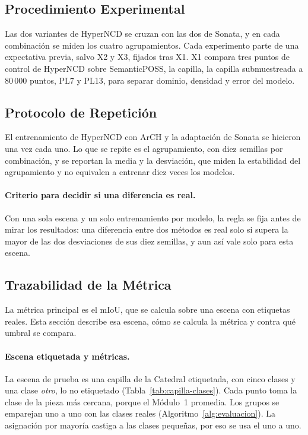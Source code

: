 \subsection{Procedimiento Experimental}
\label{sec:procedimiento}

Las dos variantes de HyperNCD se cruzan con las dos de Sonata, y en cada combinación
se miden los cuatro agrupamientos. Cada experimento parte de una expectativa previa,
salvo X2 y X3, fijados tras X1. X1 compara tres puntos de control de HyperNCD
sobre SemanticPOSS, la capilla, la capilla submuestreada a 80\,000 puntos, PL7 y PL13,
para separar dominio, densidad y error del modelo.

\subsection{Protocolo de Repetición}
\label{sec:repeticiones}

El entrenamiento de HyperNCD con ArCH y la adaptación de Sonata se hicieron una vez
cada uno. Lo que se repite es el agrupamiento, con diez semillas por combinación, y
se reportan la media y la desviación, que miden la estabilidad del agrupamiento y no
equivalen a entrenar diez veces los modelos.

\paragraph*{Criterio para decidir si una diferencia es real.} Con una sola escena y
un solo entrenamiento por modelo, la regla se fija antes de mirar los resultados: una
diferencia entre dos métodos es real solo si supera la mayor de las dos desviaciones
de sus diez semillas, y aun así vale solo para esta escena.

\subsection{Trazabilidad de la Métrica}
\label{sec:trazabilidad}

La métrica principal es el mIoU, que se calcula sobre una escena con etiquetas
reales. Esta sección describe esa escena, cómo se calcula la métrica y contra qué
umbral se compara.

\paragraph*{Escena etiquetada y métricas.} La escena de prueba es una capilla de
la Catedral etiquetada, con cinco clases y una clase \emph{otro}, lo
no etiquetado (Tabla~\ref{tab:capilla-clases}). Cada punto toma la clase de la pieza
más cercana, porque el Módulo~1 promedia. Los grupos se emparejan uno a uno
con las clases reales (Algoritmo~\ref{alg:evaluacion}). La asignación por mayoría
castiga a las clases pequeñas, por eso se usa el uno a uno.

